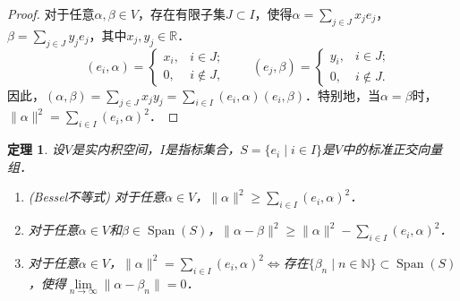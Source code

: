 \documentclass[a4paper,fontset=windows]{ctexbook}
\newtheorem{theorem}{定理}[chapter]
\theoremstyle{definition}
\DeclareMathOperator{\Span}{Span}
\renewcommand{\ge}{\geqslant}
\begin{document}
\begin{proof}
对于任意$\alpha,\beta\in V$，存在有限子集$J\subset I$，使得$\alpha=\sum\limits_{j\in J}x_je_j$，$\beta=\sum\limits_{j\in J}y_je_j$，其中$x_j,y_j\in\mathbb{R}$．
$$\quad(e_i,\alpha)=\begin{cases}x_i,&i\in J; \\ 0,&i\notin J,\end{cases}\qquad(e_j,\beta)=\begin{cases}y_i,&i\in J; \\ 0,&i\notin J.\end{cases}$$
因此，$(\alpha,\beta)=\sum\limits_{j\in J}x_jy_j=\sum\limits_{i\in I}(e_i,\alpha)(e_i,\beta)$．特别地，当$\alpha=\beta$时，$\|\alpha\|^2=\sum\limits_{i\in I}(e_i,\alpha)^2$．
\end{proof}

\begin{theorem}\label{thm10.8}
设$V$是实内积空间，$I$是指标集合，$S=\{e_i\mid i\in I\}$是$V$中的标准正交向量组．
\begin{enumerate}
\item {\rm(Bessel不等式)} 对于任意$\alpha\in V$，$\|\alpha\|^2\ge\sum\limits_{i\in I}(e_i,\alpha)^2$．

\item 对于任意$\alpha\in V$和$\beta\in\Span(S)$，$\|\alpha-\beta\|^2\ge\|\alpha\|^2-\sum\limits_{i\in I}(e_i,\alpha)^2$．
\item 对于任意$\alpha\in V$，$\|\alpha\|^2=\sum\limits_{i\in I}(e_i,\alpha)^2\Leftrightarrow$存在$\{\beta_n\mid n\in\mathbb{N}\}\subset\Span(S)$，使得$\lim\limits_{n\to\infty}\|\alpha-\beta_n\|=0$．
\end{enumerate}
\end{theorem}
\end{document}
